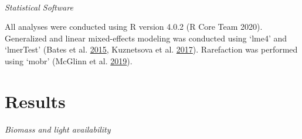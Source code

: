 \documentclass[twoside,12pt,final]{ucthesis-CA2012}
\begin{document}
\begin{ucmainmatter}
~

\emph{Statistical Software}

All analyses were conducted using R version 4.0.2 (R Core Team 2020). Generalized and linear mixed-effects modeling was conducted using `lme4' and `lmerTest' (Bates et al. \protect\hyperlink{ref-Bates2015}{2015}, Kuznetsova et al. \protect\hyperlink{ref-Kuznetsova2017}{2017}). Rarefaction was performed using `mobr' (McGlinn et al. \protect\hyperlink{ref-mcglinn2019}{2019}).

\hypertarget{results}{%
\section{Results}\label{results}}

\emph{Biomass and light availability}


\end{ucmainmatter}
\end{document}
